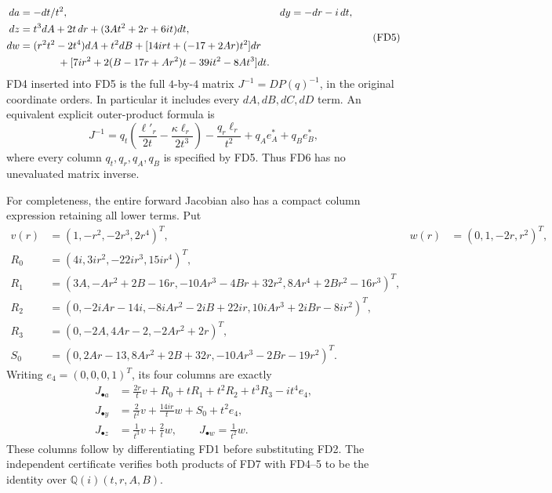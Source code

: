 \[
\begin{aligned}
 da&=-dt/t^2,&dy&=-dr-i\,dt,\\
 dz&=t^3dA+2t\,dr+(3At^2+2r+6it)dt,\\
 dw&=(r^2t^2-2t^4)dA+t^2dB
       +[14irt+(-17+2Ar)t^2]dr\\
   &\hspace{13mm}
       +[7ir^2+2(B-17r+Ar^2)t-39it^2-8At^3]dt.
\end{aligned}\tag{FD5}
\]
FD4 inserted into FD5 is the full \(4\)-by-\(4\) matrix
\(J^{-1}=DP(q)^{-1}\), in the original coordinate orders.
In particular it includes every \(dA,dB,dC,dD\) term.
An equivalent explicit outer-product formula is
\[
 J^{-1}=q_t\left(\frac{\ell'_r}{2t}
                    -\frac{\kappa\ell_r}{2t^3}\right)
          -\frac{q_r\ell_r}{t^2}+q_Ae_A^*+q_Be_B^*,
 \tag{FD6}
\]
where every column \(q_t,q_r,q_A,q_B\) is specified by FD5.
Thus FD6 has no unevaluated matrix inverse.

For completeness, the entire forward Jacobian also has a compact
column expression retaining all lower terms. Put
\[
\begin{aligned}
v(r)&=(1,-r^2,-2r^3,2r^4)^T,&
w(r)&=(0,1,-2r,r^2)^T,\\
R_0&=(4i,3ir^2,-22ir^3,15ir^4)^T,\\
R_1&=(3A,-Ar^2+2B-16r,
                  -10Ar^3-4Br+32r^2,8Ar^4+2Br^2-16r^3)^T,\\
R_2&=(0,-2iAr-14i,-8iAr^2-2iB+22ir,
                                10iAr^3+2iBr-8ir^2)^T,\\
R_3&=(0,-2A,4Ar-2,-2Ar^2+2r)^T,\\
S_0&=(0,2Ar-13,8Ar^2+2B+32r,
                              -10Ar^3-2Br-19r^2)^T.
\end{aligned}
\]
Writing \(e_4=(0,0,0,1)^T\), its four columns are exactly
\[
\begin{aligned}
J_{\bullet a}&=\frac{2r}{t}v+R_0+tR_1+t^2R_2+t^3R_3-it^4e_4,\\
J_{\bullet y}&=\frac2{t^2}v+\frac{14ir}{t}w+S_0+t^2e_4,\\
J_{\bullet z}&=\frac1{t^3}v+\frac2t w,\qquad
J_{\bullet w}=\frac1{t^2}w .
\end{aligned}\tag{FD7}
\]
These columns follow by differentiating FD1 before substituting
FD2. The independent certificate verifies both products of FD7
with FD4--5 to be the identity over
\(\mathbb Q(i)(t,r,A,B)\).

